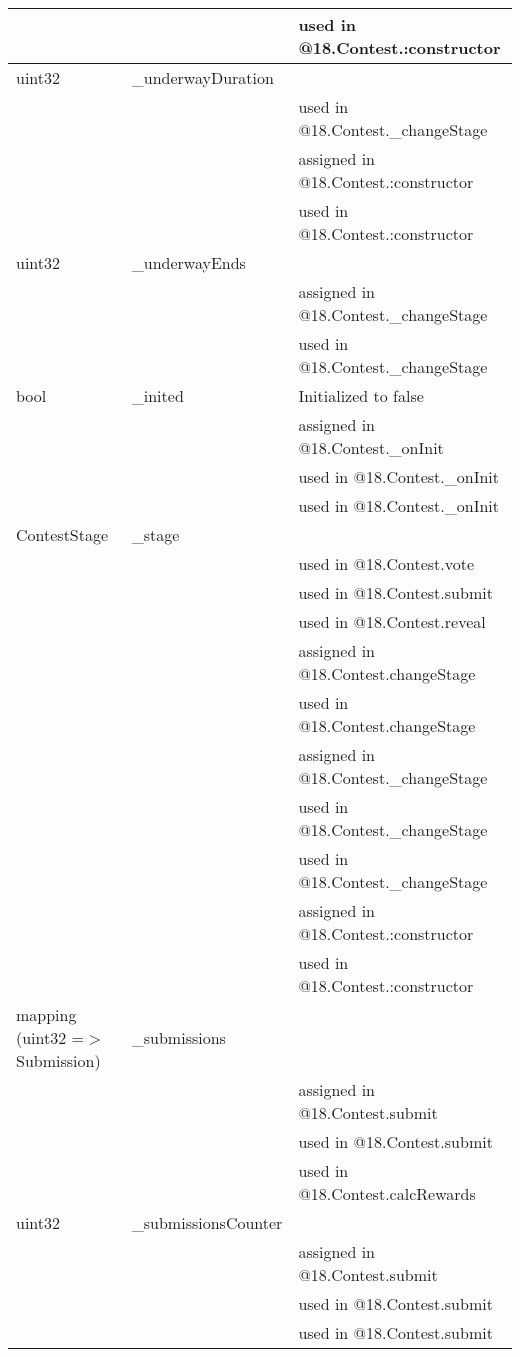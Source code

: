 \begin{tabular}{|l|l|p{5cm}|}
 & & used in @18.Contest.:constructor\\\hline
uint32 & \_{}underwayDuration &  \\\hline
 & & used in @18.Contest.\_{}changeStage\\\hline
 & & assigned in @18.Contest.:constructor\\\hline
 & & used in @18.Contest.:constructor\\\hline
uint32 & \_{}underwayEnds &  \\\hline
 & & assigned in @18.Contest.\_{}changeStage\\\hline
 & & used in @18.Contest.\_{}changeStage\\\hline
bool & \_{}inited & Initialized to false \\\hline
 & & assigned in @18.Contest.\_{}onInit\\\hline
 & & used in @18.Contest.\_{}onInit\\\hline
 & & used in @18.Contest.\_{}onInit\\\hline
ContestStage & \_{}stage &  \\\hline
 & & used in @18.Contest.vote\\\hline
 & & used in @18.Contest.submit\\\hline
 & & used in @18.Contest.reveal\\\hline
 & & assigned in @18.Contest.changeStage\\\hline
 & & used in @18.Contest.changeStage\\\hline
 & & assigned in @18.Contest.\_{}changeStage\\\hline
 & & used in @18.Contest.\_{}changeStage\\\hline
 & & used in @18.Contest.\_{}changeStage\\\hline
 & & assigned in @18.Contest.:constructor\\\hline
 & & used in @18.Contest.:constructor\\\hline
mapping (uint32 =$>$ Submission) & \_{}submissions &  \\\hline
 & & assigned in @18.Contest.submit\\\hline
 & & used in @18.Contest.submit\\\hline
 & & used in @18.Contest.calcRewards\\\hline
uint32 & \_{}submissionsCounter &  \\\hline
 & & assigned in @18.Contest.submit\\\hline
 & & used in @18.Contest.submit\\\hline
 & & used in @18.Contest.submit\\\hline

\end{tabular}
